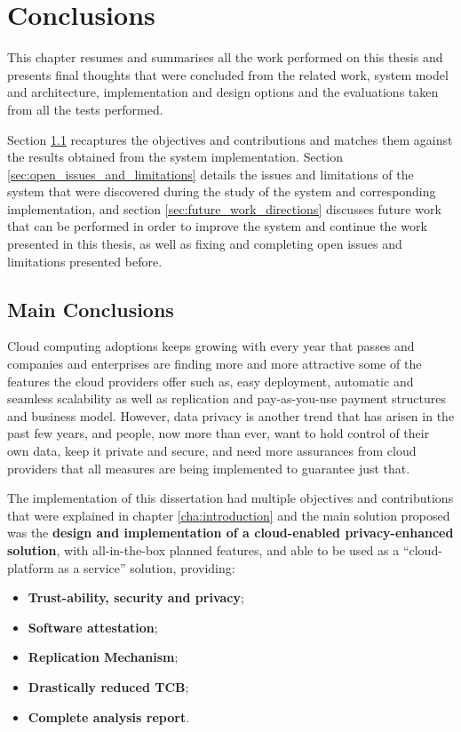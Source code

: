 
\chapter{Conclusions}
\label{cha:conclusions}

This chapter resumes and summarises all the work performed on this thesis and presents final thoughts that were concluded from the related work, system model and architecture, implementation and design options and the evaluations taken from all the tests performed.

Section \ref{sec:main_conclusion} recaptures the objectives and contributions and matches them against the results obtained from the system implementation. Section \ref{sec:open_issues_and_limitations} details the issues and limitations of the system that were discovered during the study of the system and corresponding implementation, and section \ref{sec:future_work_directions} discusses future work that can be performed in order to improve the system and continue the work presented in this thesis, as well as fixing and completing open issues and limitations presented before.

\section{Main Conclusions}
\label{sec:main_conclusion}

Cloud computing adoptions keeps growing with every year that passes and companies and enterprises are finding more and more attractive some of the features the cloud providers offer such as, easy deployment, automatic and seamless scalability as well as replication and pay-as-you-use payment structures and business model. However, data privacy is another trend that has arisen in the past few years, and people, now more than ever, want to hold control of their own data, keep it private and secure, and need more assurances from cloud providers that all measures are being implemented to guarantee just that.

The implementation of this dissertation had multiple objectives and contributions that were explained in chapter \ref{cha:introduction} and the main solution proposed was the \textbf{design and implementation of a cloud-enabled privacy-enhanced solution}, with all-in-the-box planned features, and able to be used as a “cloud-platform as a service” solution, providing:

\begin{itemize}
	\item \textbf{Trust-ability, security and privacy};
	\item \textbf{Software attestation};
 	\item \textbf{Replication Mechanism};
  	\item \textbf{Drastically reduced TCB};
  	\item \textbf{Complete analysis report}.
\end{itemize}


